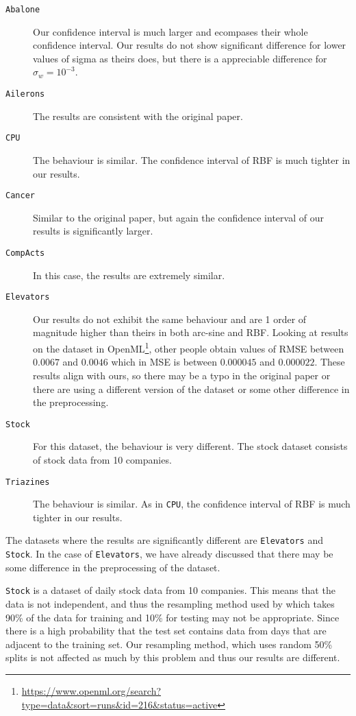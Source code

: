 \begin{description}
    \item[\texttt{Abalone}] Our confidence interval is much larger and ecompases
        their whole confidence interval. Our results do not show significant difference
        for lower values of sigma as theirs does, but there is a appreciable
        difference for $\sigma_w=10^{-3}$.
    \item[\texttt{Ailerons}] The results are consistent with the original paper.
    \item[\texttt{CPU}] The behaviour is similar. The confidence interval of RBF
        is much tighter in our results.
    \item[\texttt{Cancer}] Similar to the original paper, but again the confidence
        interval of our results is significantly larger.
    \item[\texttt{CompActs}] In this case, the results are extremely similar.
    \item[\texttt{Elevators}] Our results do not exhibit the same behaviour and
        are 1 order of magnitude higher than theirs in both arc-sine and RBF. Looking
        at results on the dataset in OpenML\footnote{\url{https://www.openml.org/search?type=data&sort=runs&id=216&status=active}}, other people obtain values of RMSE between $0.0067$ and $0.0046$ which
        in MSE is between $0.000045$ and $0.000022$. These results align with ours,
        so there may be a typo in the original paper or there are using a different
        version of the dataset or some other difference in the preprocessing.
    \item[\texttt{Stock}] For this dataset, the behaviour is very different. The
        stock dataset consists of stock data from 10 companies.
    \item[\texttt{Triazines}] The behaviour is similar. As in \texttt{CPU},
        the confidence interval of RBF is much tighter in our results.
\end{description}

The datasets where the results are significantly different are \texttt{Elevators}
and \texttt{Stock}. In the case of \texttt{Elevators}, we have already discussed
that there may be some difference in the preprocessing of the dataset.

\texttt{Stock} is a dataset of daily stock data from 10 companies. This
means that the data is not independent, and thus the resampling method used
by \textcite{frenayParameterinsensitiveKernelExtreme2011} which takes
90\% of the data for training and 10\% for testing may not be appropriate. Since
there is a high probability that the test set contains data from days that are
adjacent to the training set. Our resampling method, which uses random
50\% splits is not affected as much by this problem and thus our results are
different.
